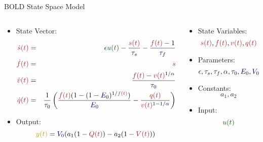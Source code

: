 \begin{frame}{BOLD State Space Model}
  \scriptsize
  \begin{columns}
  \begin{column}{.7\textwidth}
    \begin{itemize}
    \item State Vector:
    \begin{eqnarray}
    \color{mblue}\dot{s}(t) &=& {\color{mred}\epsilon} {\color{mgreen}u(t)} - 
                \frac{\color{mblue}s(t)}{\color{mred}\tau_s} - \frac{{\color{mblue}f(t)}-1}{\color{mred}\tau_f} \nonumber \\
    \color{mblue}\dot{f}(t) &=& \color{mblue}s \nonumber \\
    \color{mblue}\dot{v}(t) &=& \frac{{\color{mblue}f(t)} - 
                {\color{mblue}v(t)} ^ {1/{\color{mred}\alpha}}}{\color{mred}\tau_0} \nonumber \\
    \color{mblue}\dot{q}(t) &=& \frac{1}{\color{mred}\tau_0}
            \left(\frac{{\color{mblue}f(t)}(1-(1-{\color{mred}E_0})^{1/\color{mblue}f(t)})}{\color{mred}E_0} -
        \frac{\color{mblue}q(t)}{{\color{mblue}v(t)}^{1-1/\color{mred}\alpha}}\right) \nonumber 
    \end{eqnarray}
    \item Output:
    $${\color{myellow}y(t)} = {\color{mred}V_0}(a_1( 1 - {\color{mblue}Q(t)}) - a_2(1 - {\color{mblue}V(t)}))$$
    \end{itemize}
  \end{column}

  \begin{column}{.3\textwidth}
    \begin{itemize}
        \item State Variables:
        $${\color{mblue}s(t)}, {\color{mblue}f(t)}, {\color{mblue}v(t)}, {\color{mblue}q(t)}$$
        \item Parameters:
        $${\color{mred}\epsilon}, {\color{mred}\tau_s}, {\color{mred}\tau_f}, {\color{mred}\alpha}, 
                    {\color{mred}\tau_0}, {\color{mred}E_0}, {\color{mred}V_0}$$
        \item Constants:
        $$a_1, a_2$$
        \item Input:
        $$\color{mgreen}u(t)$$
    \end{itemize}
  \end{column}
  \end{columns}
\end{frame}
